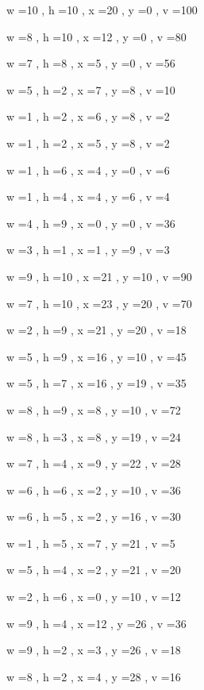 \documentclass[11pt]{article}
\begin{document}


w =10 , h =10 , x =20 , y =0 , v =100
\par
w =8 , h =10 , x =12 , y =0 , v =80
\par
w =7 , h =8 , x =5 , y =0 , v =56
\par
w =5 , h =2 , x =7 , y =8 , v =10
\par
w =1 , h =2 , x =6 , y =8 , v =2
\par
w =1 , h =2 , x =5 , y =8 , v =2
\par
w =1 , h =6 , x =4 , y =0 , v =6
\par
w =1 , h =4 , x =4 , y =6 , v =4
\par
w =4 , h =9 , x =0 , y =0 , v =36
\par
w =3 , h =1 , x =1 , y =9 , v =3
\par
w =9 , h =10 , x =21 , y =10 , v =90
\par
w =7 , h =10 , x =23 , y =20 , v =70
\par
w =2 , h =9 , x =21 , y =20 , v =18
\par
w =5 , h =9 , x =16 , y =10 , v =45
\par
w =5 , h =7 , x =16 , y =19 , v =35
\par
w =8 , h =9 , x =8 , y =10 , v =72
\par
w =8 , h =3 , x =8 , y =19 , v =24
\par
w =7 , h =4 , x =9 , y =22 , v =28
\par
w =6 , h =6 , x =2 , y =10 , v =36
\par
w =6 , h =5 , x =2 , y =16 , v =30
\par
w =1 , h =5 , x =7 , y =21 , v =5
\par
w =5 , h =4 , x =2 , y =21 , v =20
\par
w =2 , h =6 , x =0 , y =10 , v =12
\par
w =9 , h =4 , x =12 , y =26 , v =36
\par
w =9 , h =2 , x =3 , y =26 , v =18
\par
w =8 , h =2 , x =4 , y =28 , v =16
\par
\newpage
\end{document}
